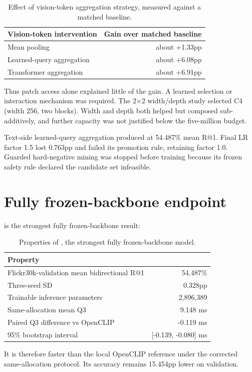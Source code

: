 \begin{table}[htbp]
\centering
\caption{Effect of vision-token aggregation strategy, measured against a matched baseline.}
\label{tab:aggregation}
\begin{tabular}{L{7.5cm}r}
\toprule
Vision-token intervention & Gain over matched baseline \\
\midrule
Mean pooling & about +1.33pp \\
Learned-query aggregation & about +6.08pp \\
Transformer aggregation & about +6.91pp \\
\bottomrule
\end{tabular}
\end{table}
Thus patch access alone explained little of the gain. A learned selection or interaction mechanism was required. The 2$\times$2 width/depth study selected C4 (width 256, two blocks). Width and depth both helped but composed sub-additively, and further capacity was not justified below the five-million budget.

Text-side learned-query aggregation produced \MTone{} at 54.487\% mean R@1. Final LR factor 1.5 lost 0.763pp and failed its promotion rule, retaining factor 1.0. Guarded hard-negative mining was stopped before training because its frozen safety rule declared the candidate set infeasible.

\section{Fully frozen-backbone endpoint}
\MTone{} is the strongest fully frozen-backbone result:

\begin{table}[htbp]
\centering
\caption{Properties of \MTone{}, the strongest fully frozen-backbone model.}
\label{tab:mt1}
\begin{tabular}{L{8.5cm}r}
\toprule
Property & \MTone{} \\
\midrule
Flickr30k-validation mean bidirectional R@1 & 54.487\% \\
Three-seed SD & 0.328pp \\
Trainable inference parameters & 2,896,389 \\
Same-allocation mean Q3 & 9.148 ms \\
Paired Q3 difference vs OpenCLIP & -0.119 ms \\
95\% bootstrap interval & [-0.139, -0.080] ms \\
\bottomrule
\end{tabular}
\end{table}
It is therefore faster than the local OpenCLIP reference under the corrected same-allocation protocol. Its accuracy remains 15.454pp lower on validation.

